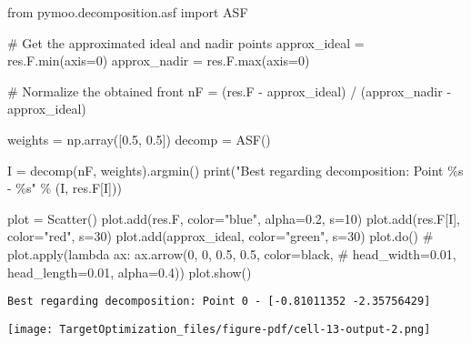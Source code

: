 \documentclass[
  letterpaper,
  DIV=11,
  numbers=noendperiod]{scrartcl}
\newenvironment{Shaded}{\begin{snugshade}}{\end{snugshade}}
\newcommand{\BuiltInTok}[1]{\textcolor[rgb]{0.00,0.23,0.31}{#1}}
\newcommand{\CommentTok}[1]{\textcolor[rgb]{0.37,0.37,0.37}{#1}}
\newcommand{\DecValTok}[1]{\textcolor[rgb]{0.68,0.00,0.00}{#1}}
\newcommand{\FloatTok}[1]{\textcolor[rgb]{0.68,0.00,0.00}{#1}}
\newcommand{\ImportTok}[1]{\textcolor[rgb]{0.00,0.46,0.62}{#1}}
\newcommand{\NormalTok}[1]{\textcolor[rgb]{0.00,0.23,0.31}{#1}}
\newcommand{\OperatorTok}[1]{\textcolor[rgb]{0.37,0.37,0.37}{#1}}
\newcommand{\SpecialCharTok}[1]{\textcolor[rgb]{0.37,0.37,0.37}{#1}}
\newcommand{\StringTok}[1]{\textcolor[rgb]{0.13,0.47,0.30}{#1}}
\begin{document}
\begin{Shaded}
\begin{Highlighting}[]
\ImportTok{from}\NormalTok{ pymoo.decomposition.asf }\ImportTok{import}\NormalTok{ ASF}

\CommentTok{\# Get the approximated ideal and nadir points}
\NormalTok{approx\_ideal }\OperatorTok{=}\NormalTok{ res.F.}\BuiltInTok{min}\NormalTok{(axis}\OperatorTok{=}\DecValTok{0}\NormalTok{)}
\NormalTok{approx\_nadir }\OperatorTok{=}\NormalTok{ res.F.}\BuiltInTok{max}\NormalTok{(axis}\OperatorTok{=}\DecValTok{0}\NormalTok{)}

\CommentTok{\# Normalize the obtained front}
\NormalTok{nF }\OperatorTok{=}\NormalTok{ (res.F }\OperatorTok{{-}}\NormalTok{ approx\_ideal) }\OperatorTok{/}\NormalTok{ (approx\_nadir }\OperatorTok{{-}}\NormalTok{ approx\_ideal)}

\NormalTok{weights }\OperatorTok{=}\NormalTok{ np.array([}\FloatTok{0.5}\NormalTok{, }\FloatTok{0.5}\NormalTok{])}
\NormalTok{decomp }\OperatorTok{=}\NormalTok{ ASF()}

\NormalTok{I }\OperatorTok{=}\NormalTok{ decomp(nF, weights).argmin()}
\BuiltInTok{print}\NormalTok{(}\StringTok{"Best regarding decomposition: Point }\SpecialCharTok{\%s}\StringTok{ {-} }\SpecialCharTok{\%s}\StringTok{"} \OperatorTok{\%}\NormalTok{ (I, res.F[I]))}

\NormalTok{plot }\OperatorTok{=}\NormalTok{ Scatter()}
\NormalTok{plot.add(res.F, color}\OperatorTok{=}\StringTok{"blue"}\NormalTok{, alpha}\OperatorTok{=}\FloatTok{0.2}\NormalTok{, s}\OperatorTok{=}\DecValTok{10}\NormalTok{)}
\NormalTok{plot.add(res.F[I], color}\OperatorTok{=}\StringTok{"red"}\NormalTok{, s}\OperatorTok{=}\DecValTok{30}\NormalTok{)}
\NormalTok{plot.add(approx\_ideal, color}\OperatorTok{=}\StringTok{"green"}\NormalTok{, s}\OperatorTok{=}\DecValTok{30}\NormalTok{)}
\NormalTok{plot.do()}
\CommentTok{\# plot.apply(lambda ax: ax.arrow(0, 0, 0.5, 0.5, color=\textquotesingle{}black\textquotesingle{},}
\CommentTok{\#                                head\_width=0.01, head\_length=0.01, alpha=0.4))}
\NormalTok{plot.show()}
\end{Highlighting}
\end{Shaded}

\begin{verbatim}
Best regarding decomposition: Point 0 - [-0.81011352 -2.35756429]
\end{verbatim}

\texttt{[image: TargetOptimization\_files/figure-pdf/cell-13-output-2.png]}
\end{document}
